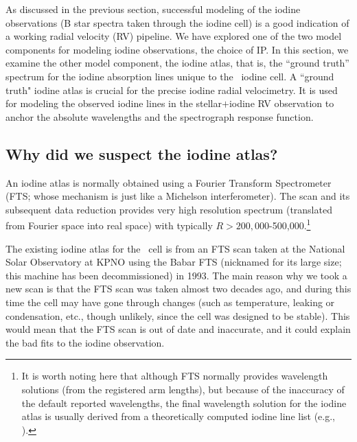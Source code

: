 
As discussed in the previous section, successful modeling of the
iodine observations (B star spectra taken through the iodine cell) is
a good indication of a working radial velocity (RV) pipeline. We have
explored one of the two model components for modeling iodine
observations, the choice of IP. In this section, we examine the other
model component, the iodine atlas, that is, the ``ground truth''
spectrum for the iodine absorption lines unique to the \het\ iodine
cell. A ``ground truth" iodine atlas is crucial for the precise iodine
radial velocimetry. It is used for modeling the observed iodine lines
in the stellar$+$iodine RV observation to anchor the absolute
wavelengths and the spectrograph response function. 


\subsection{Why did we suspect the iodine atlas?}

An iodine atlas is normally obtained using a Fourier Transform
Spectrometer (FTS; whose mechanism is just like a Michelson
interferometer). The scan and its subsequent data reduction provides
very high resolution spectrum (translated from Fourier space into real
space) with typically $R > 200,000$-500,000.\footnote{It is worth
noting here that although FTS normally provides wavelength solutions
(from the registered arm lengths), but because of the inaccuracy of
the default reported wavelengths, the final wavelength solution for
the iodine atlas is usually derived from a theoretically computed
iodine line list (e.g., \citealt{iodinespec5}).}

The existing iodine atlas for the \het\ cell is from an FTS scan taken
at the National Solar Observatory at KPNO using the Babar FTS
(nicknamed for its large size; this machine has been decommissioned)
in 1993. The main reason why we took a new scan is that the FTS scan
was taken almost two decades ago, and during this time the cell may
have gone through changes (such as temperature, leaking or
condensation, etc., though unlikely, since the cell was designed to be
stable). This would mean that the FTS scan is out of date and
inaccurate, and it could explain the bad fits to the iodine
observation.

